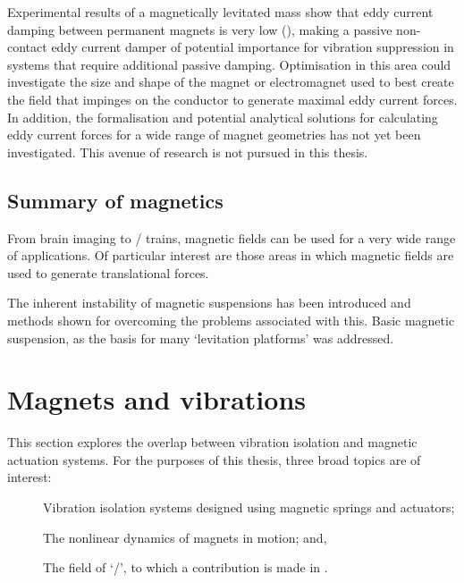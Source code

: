 \documentclass[11pt,a4paper]{memoir}
\begin{document}
Experimental results of a magnetically levitated mass show that eddy current damping between permanent magnets is very low (), making a passive non-contact eddy current damper of potential importance for vibration suppression in systems that require additional passive damping.
Optimisation in this area could investigate the size and shape of the magnet or electromagnet used to best create the field that impinges on the conductor to generate maximal eddy current forces.
In addition, the formalisation and potential analytical solutions for calculating eddy current forces for a wide range of magnet geometries has not yet been investigated.
This avenue of research is not pursued in this thesis.


\subsection{Summary of magnetics}

From brain imaging to \maglev/ trains, magnetic fields can be used for a very wide range of applications. Of particular interest are those areas in which magnetic fields are used to generate translational forces.

The inherent instability of magnetic suspensions has been introduced and methods shown for overcoming the problems associated with this.
Basic magnetic suspension, as the basis for many `levitation platforms' was addressed.


\section{Magnets and vibrations}

This section explores the overlap between vibration isolation and magnetic actuation systems.
For the purposes of this thesis, three broad topics are of interest:
\begin{description}
\item[]
Vibration isolation systems designed using magnetic springs and actuators;
\item[]
The nonlinear dynamics of magnets in motion; and,
\item[]
The field of `\qzs/', to which a contribution is made in .
\end{description}
\end{document}
